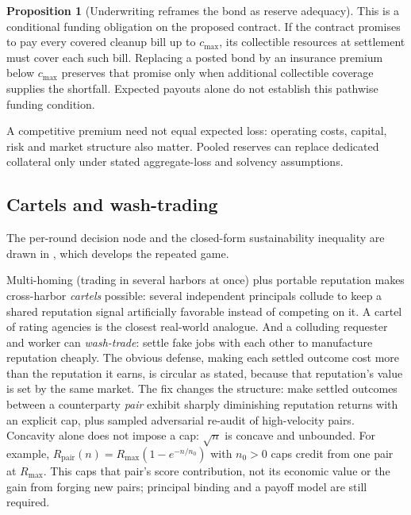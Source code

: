 \documentclass[11pt,a4paper]{article}
\theoremstyle{definition}
\newtheorem{proposition}{Proposition}[section]
\theoremstyle{definition}
\theoremstyle{remark}
\begin{document}
\begin{proposition}[Underwriting reframes the bond as reserve adequacy]\label{prop:reserve}
\pdstatus{\Designed}{}
This is a conditional funding obligation on the proposed contract.
If the contract promises to pay every covered cleanup bill up to $c_{\max}$, its
collectible resources at settlement must cover each such bill. Replacing a
posted bond by an insurance premium below $c_{\max}$ preserves that promise only
when additional collectible coverage supplies the shortfall. Expected payouts
alone do not establish this pathwise funding condition.

A competitive premium need not equal expected loss: operating costs, capital,
risk and market structure also matter. Pooled reserves can replace dedicated
collateral only under stated aggregate-loss and solvency assumptions.
\end{proposition}

\subsection{Cartels and wash-trading}\label{sec:fh-failure-modes}

\ifpdbook
The per-round decision node and the closed-form sustainability
inequality are drawn in , which develops the repeated game.
\else

\fi

Multi-homing (trading in several harbors at once) plus portable reputation
makes cross-harbor \emph{cartels} possible: several independent principals
collude to keep a shared reputation signal artificially favorable instead of
competing on it. A cartel of rating agencies is the closest real-world
analogue. And a colluding requester and worker can \emph{wash-trade}: settle
fake jobs with each other to manufacture reputation cheaply. The obvious
defense, making each settled outcome cost more than the reputation it earns,
is circular as stated, because that reputation's value is set by the same
market. The fix changes the structure: make settled outcomes between a counterparty \emph{pair} exhibit sharply diminishing
reputation returns with an explicit cap, plus sampled adversarial re-audit
of high-velocity pairs. Concavity alone does not impose a cap: $\sqrt n$ is
concave and unbounded. For example, $R_{\mathrm{pair}}(n)=R_{\max}(1-e^{-n/n_0})$
with $n_0>0$ caps credit from one pair at $R_{\max}$. This caps that pair's
score contribution, not its economic value or the gain from forging new pairs;
principal binding and a payoff model are still required.
\end{document}
